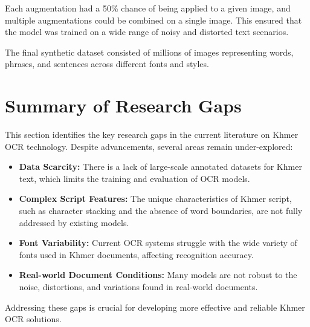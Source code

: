 Each augmentation had a 50\% \cite{buoy2021seq2seq} chance of being applied to a given image, and multiple augmentations could be combined on a single image. This ensured that the model was trained on a wide range of noisy and distorted text scenarios.

The final synthetic dataset consisted of millions of images representing words, 
phrases, and sentences across different fonts and styles.

\section{Summary of Research Gaps}
\label{sec:research-gaps}

This section identifies the key research gaps in the current literature on 
Khmer OCR technology. Despite advancements, several areas remain under-explored:

\begin{itemize}
    \item \textbf{Data Scarcity:} There is a lack of large-scale annotated datasets for Khmer text, which limits the training and evaluation of OCR models.
    \item \textbf{Complex Script Features:} The unique characteristics of Khmer script, such as character stacking and the absence of word boundaries, are not fully addressed by existing models.
    \item \textbf{Font Variability:} Current OCR systems struggle with the wide variety of fonts used in Khmer documents, affecting recognition accuracy.
    \item \textbf{Real-world Document Conditions:} Many models are not robust to the noise, distortions, and variations found in real-world documents.
\end{itemize}

Addressing these gaps is crucial for developing more effective and reliable Khmer OCR solutions.

